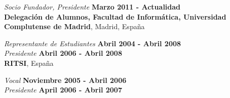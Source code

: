 \documentclass[margin,line]{resume}
\begin{document}
\begin{resume}
\vspace{-.3cm}
{\em Socio Fundador, Presidente} \hfill {\bf Marzo 2011 - Actualidad}\\


{\bf Delegación de Alumnos, Facultad de Informática, Universidad Complutense de
Madrid}, Madrid, España

\vspace{-.3cm}
{\em Representante de Estudiantes} \hfill {\bf Abril 2004 - Abril 2008}\\
{\em Presidente} \hfill {\bf Abril 2006 - Abril 2008}\\

{\bf RITSI}, España

\vspace{-.3cm}
{\em Vocal} \hfill {\bf  Noviembre 2005 - Abril 2006}\\
{\em Presidente} \hfill {\bf  April 2006 - Abril 2007}\\

%




\end{resume}
\end{document}
